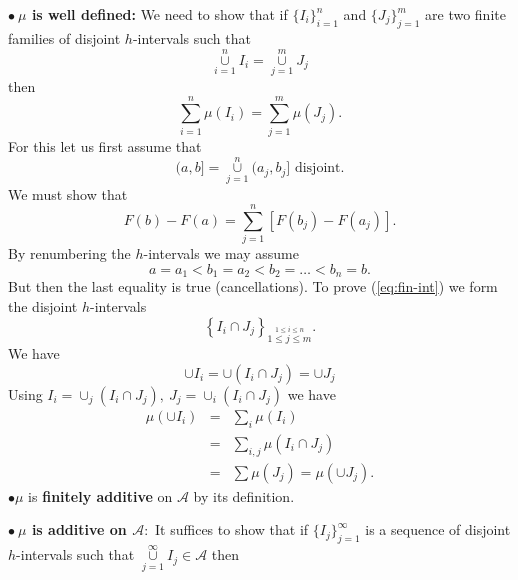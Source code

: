\documentclass[12pt]{report}
\begin{document}
\medskip
\noindent
{\bf  $\bullet \ \mu $ is well defined:}  We need to show that if
$\{I_i\}^n_{i = 1}$ and $\{J_j\}^m_{j=1}$ are two finite families of disjoint
$h$-intervals such that
\[
\overset{n}{\underset{i=1}{\cup}}  I_i =
 \overset{m}{\underset{j=1}{\cup}} J_j
\] 
then
\begin{equation} 
\label{eq:fin-int} 
 \sum^n_{i = 1} \mu(I_i) = \sum^m_{j=1} \mu(J_j).
\end{equation}
For this let us first assume that
\[(a, b] = \overset{n}{\underset{j=1}{\cup}}  (a_j, b_j] \mbox{ disjoint}.
\]
 We must show that
\begin{equation*}
 F(b) - F(a) = \sum^n_{j=1} [F(b_j) - F(a_j)].
\end{equation*} 
By renumbering the $h$-intervals we may assume
\[a = a_1 < b_1 = a_2 < b_2 = \dots < b_n = b.
\] 
But then the last equality is true (cancellations).
 To prove (\ref{eq:fin-int}) we form the disjoint $h$-intervals
\[\left \{ I_i \cap J_j \right \}_{\stackrel{1 \le i \le n}{1 \le j \le m}}.
\] We have
\[\cup I_i = \cup (I_i \cap J_j) = \cup J_j
\] 
Using $I_i = \cup_j (I_i \cap J_j), \ J_j = \cup_i (I_i \cap J_j)$
we have
\begin{eqnarray*}
\mu(\cup I_i) &=& \sum_i \mu(I_i)\\
&=& \sum_{i,j} \mu(I_i \cap J_j)\\ &=& \sum
\mu(J_j) = \mu(\cup J_j).
\end{eqnarray*}
$\bullet \mu$ is {\bf  finitely additive} on $\mathcal{A}$ by its
definition.

\medskip
\noindent
{\bf  $\bullet \ \mu$ is additive on $\mathcal{A}:$} It suffices to show
that if
$\{I_j\}^\infty_{j=1}$ is a sequence of disjoint $h$-intervals such that
$\overset{\infty}{\underset{j=1}{\cup}}  I_j \in \mathcal{A}$ then
\end{document}

